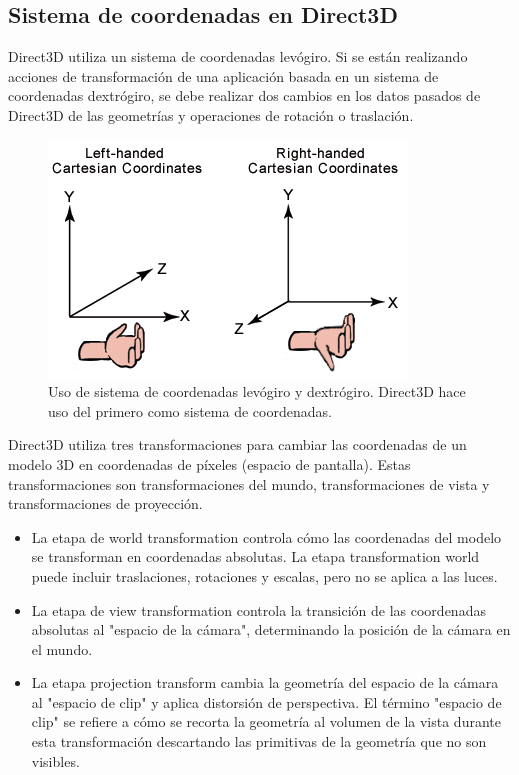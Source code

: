 \documentclass[a4paper, 17pt]{book}
\begin{document}
\subsection{Sistema de coordenadas en Direct3D} 
\label{subsec:SysDirectX}

Direct3D utiliza un sistema de coordenadas levógiro. Si se están realizando acciones de transformación de una aplicación 
basada en un sistema de coordenadas dextrógiro, se debe realizar dos cambios en los datos pasados de Direct3D de las
geometrías y operaciones de rotación o traslación.

\begin{figure}[hbt!]
    \centering
    \includegraphics[scale=0.95, keepaspectratio]{img/leftrght.png}
    \caption{Uso de sistema de coordenadas levógiro y dextrógiro. Direct3D hace uso del primero como sistema de coordenadas.}
    \label{figura:khronos}
\end{figure}

Direct3D utiliza tres transformaciones para cambiar las coordenadas de un modelo 3D en coordenadas de píxeles (espacio de pantalla).
Estas transformaciones son transformaciones del mundo, transformaciones de vista y transformaciones de proyección.

\begin{itemize}
  \item La etapa de world transformation controla cómo las coordenadas del modelo se transforman en coordenadas absolutas.
  La etapa transformation world puede incluir traslaciones, rotaciones y escalas, pero no se aplica a las luces.
  
  \item La etapa de view transformation controla la transición de las coordenadas absolutas al "espacio de la cámara",
  determinando la posición de la cámara en el mundo.

  \item La etapa projection transform cambia la geometría del espacio de la cámara al "espacio de clip" y aplica
  distorsión de perspectiva. El término "espacio de clip" se refiere a cómo se recorta la geometría al volumen
  de la vista durante esta transformación descartando las primitivas de la geometría que no son visibles.
  
\end{itemize}
\end{document}
